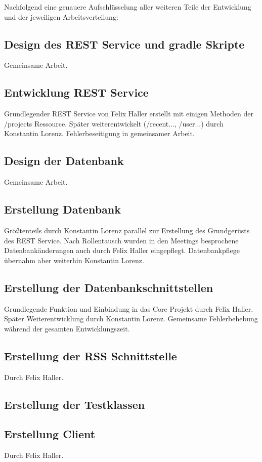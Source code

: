 \documentclass[12pt]{scrartcl}
\begin{document}
		Nachfolgend eine genauere Aufschlüsselung aller weiteren Teile der Entwicklung und der jeweiligen Arbeitsverteilung:
	 
		
		\subsection{Design des REST Service und gradle Skripte}
			Gemeinsame Arbeit.
		\subsection{Entwicklung REST Service}
			Grundlegender REST Service von Felix Haller erstellt mit einigen Methoden der /projects Ressource. Später weiterentwickelt (/recent..., /user...) durch Konstantin Lorenz. Fehlerbeseitigung in gemeinsamer Arbeit. 
		\subsection{Design der Datenbank}
			Gemeinsame Arbeit.
		\subsection{Erstellung Datenbank}
			Größtenteils durch Konstantin Lorenz parallel zur Erstellung des Grundgerüsts des REST Service. Nach Rollentausch wurden in den Meetings besprochene Datenbankänderungen auch durch Felix Haller eingepflegt. Datenbankpflege übernahm aber weiterhin Konstantin Lorenz.
		\subsection{Erstellung der Datenbankschnittstellen}
			Grundlegende Funktion und Einbindung in das Core Projekt durch Felix Haller. Später Weiterentwicklung durch Konstantin Lorenz. Gemeinsame Fehlerbehebung während der gesamten Entwicklungszeit.
		\subsection{Erstellung der RSS Schnittstelle}
			Durch Felix Haller.
		\subsection{Erstellung der Testklassen}
			
		\subsection{Erstellung Client}
			Durch Felix Haller.
\end{document}
